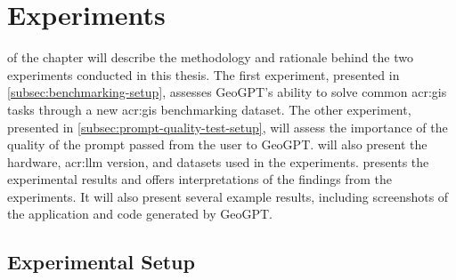 \chapter{Experiments}
\label{cha:experiments}

 of the  chapter will describe the methodology and rationale behind the two experiments conducted in this thesis. The first experiment, presented in \autoref{subsec:benchmarking-setup}, assesses GeoGPT's ability to solve common \acrshort{acr:gis} tasks through a new \acrshort{acr:gis} benchmarking dataset. The other experiment, presented in \autoref{subsec:prompt-quality-test-setup}, will assess the importance of the quality of the prompt passed from the user to GeoGPT.  will also present the hardware, \acrshort{acr:llm} version, and datasets used in the experiments.  presents the experimental results and offers interpretations of the findings from the experiments. It will also present several example results, including screenshots of the application and code generated by GeoGPT.

\section{Experimental Setup}
\label{sec:experimental-setup}

\begin{comment}
Trying and failing is a major part of research. However, to have a chance of success you need a plan driving the experimental research, just as you need a plan for your literature search. Further, plans are made to be revised and this revision ensures that any further decisions made are in line with the work already completed.

The plan should include what experiments or series of experiments are planned and what questions the individual or set of experiments aim to answer. Such questions should be connected to your research questions, so that in the evaluation of your results you can discuss the results wrt to the research questions.
\end{comment}

\begin{comment}
The experimental setup should include all data --- parameters, etc. --- that would allow a person to repeat your experiments.
This will thus be the actual instantiation for each experiment of the general architecture described in Chapter~\ref{cha:architecture}.
\end{comment}


